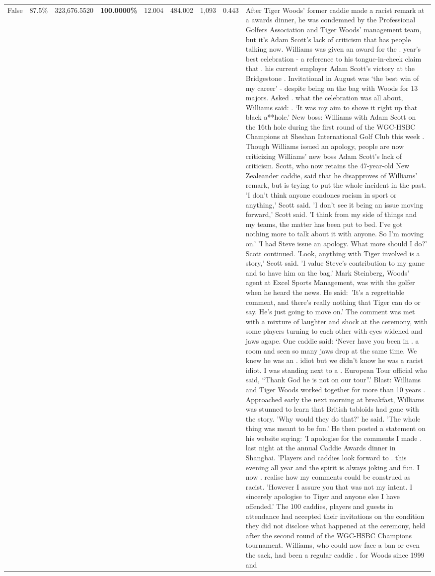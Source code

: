 \begin{table}[H]
\begin{tabular}{lllrlllll}
False & 87.5\% & 323,676.5520 & \bfseries \color{red} 100.0000\% & 12.004 & 484.002 & 1,093 & 0.443 & After Tiger Woods' former caddie made a racist remark at a awards dinner, he was condemned by the Professional Golfers Association and Tiger Woods' management team, but it's Adam Scott's lack of criticism that has people talking now. Williams was given an award for the . year’s best celebration - a reference to his tongue-in-cheek claim that . his current employer Adam Scott’s victory at the Bridgestone . Invitational in August was ‘the best win of my career’ - despite being on the bag with Woods for 13 majors. Asked . what the celebration was all about, Williams said: . ‘It was my aim to shove it right up that black a**hole.’ New boss: Williams with Adam Scott  on the 16th hole during the first round of the WGC-HSBC Champions at Sheshan International Golf Club this week . Though Williams issued an apology, people are now criticizing Williams' new boss Adam Scott's lack of criticism. Scott, who now retains the 47-year-old New Zealeander caddie, said that he disapproves of Williams' remark, but is trying to put the whole incident in the past. 'I don't think anyone condones racism in sport or anything,' Scott said. 'I don't see it being an issue moving forward,' Scott said. 'I think from my side of things and my teams, the matter has been put to bed. I've got nothing more to talk about it with anyone. So I'm moving on.' 'I had Steve issue an apology. What more should I do?' Scott continued. 'Look, anything with Tiger involved is a story,' Scott said. 'I value Steve's contribution to my game and to have him on the bag.' Mark Steinberg, Woods' agent at Excel Sports Management, was with the golfer when he heard the news. He said: 'It's a regrettable comment, and there's really nothing that Tiger can do or say. He's just going to move on.' The comment was met with a mixture of laughter and shock at the ceremony, with some players turning to each other with eyes widened and jaws agape. One caddie said: ‘Never have you been in . a room and seen so many jaws drop at the same time. We knew he was an . idiot but we didn’t know he was a racist idiot. I was standing next to a . European Tour official who said, “Thank God he is not on our tour”.’ Blast: Williams and Tiger Woods worked together for more than 10 years . Approached early the next morning at breakfast, Williams was stunned to learn that British tabloids had gone with the story. 'Why would they do that?' he said. 'The whole thing was meant to be fun.' He then posted a statement on his website saying: 'I apologise for the comments I made . last night at the annual Caddie Awards dinner in Shanghai. 'Players and caddies look forward to . this evening all year and the spirit is always joking and fun. I now . realise how my comments could be construed as racist. 'However I assure you that was not my intent. I sincerely apologise to Tiger and anyone else I have offended.' The 100 caddies, players and guests in attendance had accepted their invitations on the condition they did not disclose what happened at the ceremony, held after the second round of the WGC-HSBC Champions tournament. Williams, who could now face a ban or even the sack, had been a regular caddie . for Woods since 1999 and 
\end{tabular}
\end{table}
